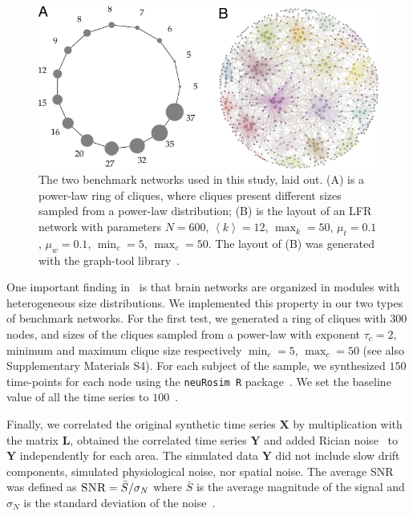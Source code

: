 \begin{figure}[htb!]
\includegraphics[width=1\textwidth]{images/lfrringclique.pdf}
\caption{The two benchmark networks used in this study, laid out. (A) is a power-law ring of cliques, where cliques present different sizes sampled from a power-law distribution;
(B) is the layout of an LFR network with parameters $N=600$, $\left< k \right>=12$,  $\max_k=50$, $\mu_t=0.1$, $\mu_w=0.1$, $\min_c=5$, $\max_c=50$.
The layout of (B) was generated with the graph-tool library~\cite{peixoto_graph_tool_2014}.}
\label{fig:lfrringclique}
\end{figure}

One important finding in~\cite{nicolini2016} is that brain networks are organized in modules with heterogeneous size distributions.
We implemented this property in our two types of benchmark networks.
For the first test, we generated a ring of cliques with $300$ nodes, and sizes of the cliques sampled from a power-law with exponent $\tau_c=2$, minimum and maximum clique size respectively $\min_c=5$, $\max_c=50$ (see also Supplementary Materials S4).
For each subject of the sample, we synthesized $150$ time-points for each node using the \texttt{neuRosim R} package~\cite{neurosim2011}. We set the baseline value of all the time series to $100$~\cite{welvaert2013}.

Finally, we correlated the original synthetic time series $\mathbf{X}$ by multiplication with the matrix $\mathbf{L}$, obtained the correlated time series $\mathbf{Y}$ and added Rician noise~\cite{gudbjartsson1995} to $\mathbf{Y}$ independently for each area. The simulated data $\mathbf{Y}$ did not include slow drift components, simulated physiological noise, nor spatial noise. The average SNR was defined as $\textsc{SNR}=\bar{S}/\sigma_N$ where $\bar{S}$ is the average magnitude of the signal and $\sigma_N$ is the standard deviation of the noise~\cite{kruger2011}.

